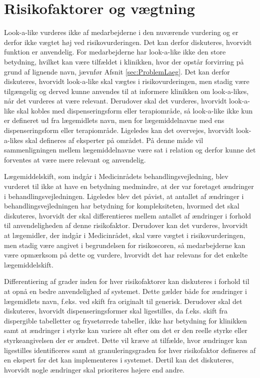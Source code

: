 \section{Risikofaktorer og vægtning}
Look-a-like vurderes ikke af medarbejderne i den nuværende vurdering og er derfor ikke vægtet høj ved risikovurderingen. Det kan derfor diskuteres, hvorvidt funktion er anvendelig. For medarbejderne har look-a-like ikke den store betydning, hvilket kan være tilfældet i klinikken, hvor der opstår forvirring på grund af lignende navn, jævnfør Afsnit \ref{sec:ProblemLaeg}. Det kan derfor diskuteres, hvorvidt look-a-like skal vægtes i risikovurderingen, men stadig være tilgængelig og derved kunne anvendes til at informere klinikken om look-a-likes, når det vurderes at være relevant. Derudover skal det vurderes, hvorvidt look-a-like skal kobles med dispenseringsform eller terapiområde, så look-a-like ikke kun er defineret ud fra lægemidlets navn, men for lægemiddelnavne med ens dispenseringsform eller terapiområde. Ligeledes kan det overvejes, hvorvidt look-a-likes skal defineres af eksperter på området. På denne måde vil sammenligningen mellem lægemiddelnavne være sat i relation og derfor kunne det forventes at være mere relevant og anvendelig.

Lægemiddelskift, som indgår i Medicinrådets behandlingsvejledning, blev vurderet til ikke at have en betydning medmindre, at der var foretaget ændringer i behandlingsvejledningen. Ligeledes blev det påvist, at antallet af ændringer i behandlingsvejledningen har betydning for kompleksiteten, hvormed det skal diskuteres, hvorvidt der skal differentieres mellem antallet af ændringer i forhold til anvendeligheden af denne risikofaktor. Derudover kan det vurderes, hvorvidt at lægemidler, der indgår i Medicinrådet, skal være vægtet i risikovurderingen, men stadig være angivet i begrundelsen for risikoscoren, så medarbejderne kan være opmærksom på dette og vurdere, hvorvidt det har relevans for det enkelte lægemiddelskift.

Differentiering af grader inden for hver risikofaktorer kan diskuteres i forhold til at opnå en bedre anvendelighed af systemet. Dette gælder både for ændringer i lægemidlets navn, f.eks. ved skift fra originalt til generisk. Derudover skal det diskuteres, hvorvidt dispenseringsformer skal ligestilles, da f.eks. skift fra dispergible tabelletter og frysetørrede tabeller, ikke har betydning for klinikken samt at ændringer i styrke kan variere alt efter om det er den reelle styrke eller styrkeangivelsen der er ændret. Dette vil kræve at tilfælde, hvor ændringer kan ligestilles identificeres samt at granuleringsgraden for hver risikofaktor defineres af en ekspert før det kan implementeres i systemet. Dertil kan det diskuteres, hvorvidt nogle ændringer skal prioriteres højere end andre. 

